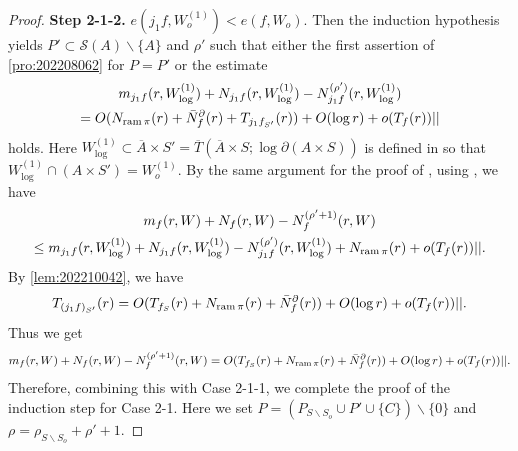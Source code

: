 \documentclass[11pt,english]{smfart}
\theoremstyle{plain}
\theoremstyle{definition}
\theoremstyle{remark}
\numberwithin{equation}{section}
\theoremstyle{plain}
\newcommand{\pN}[1]{\bar{N}_{#1}^{\partial}}
\newcommand{\ram}{{\rm ram}\,}
\begin{document}
\begin{proof}
		\textbf{Step 2-1-2.} $e(j_1f,W_o^{(1)})<e(f,W_o)$.
		Then the induction hypothesis yields $P'\subset \mathcal{S}(A)\backslash\{A\}$ and $\rho'$ such that either the first assertion of  \cref{pro:202208062} for $P=P'$ or the estimate
		\begin{multline*}
			m_{j_1f}(r,W_{\log}^{(1)})+N_{j_1f}(r,W_{\log}^{(1)})-N^{(\rho')}_{j_1f}(r,W_{\log}^{(1)})
			\\
			=O(N_{\ram\pi}(r)+\pN{f}(r)
			+T_{j_1f_{S'}}(r))+O(\log r)+o(T_f(r))||
		\end{multline*}
		holds.
		Here $W_{\log}^{(1)}\subset \overline{A}\times S'=\overline{T}(\overline{A}\times S;\log \partial (A\times S))$ is defined in \cite[Section 5]{Yam04} so that $W_{\log}^{(1)}\cap (A\times S')=W_o^{(1)}$.
		By the same argument for the proof of \cite[Lemma 5]{Yam15}, using \cite[Thm 5.1.7]{Yam04}, we have
		\begin{multline}\label{eqn:20250904}
			m_f(r,W)+N_f(r,W)-N^{(\rho'+1)}_f(r,W)
			\\
			\leq m_{j_1f}(r,W_{\log}^{(1)})+N_{j_1f}(r,W_{\log}^{(1)})-N^{(\rho')}_{j_1f}(r,W_{\log}^{(1)})+N_{\ram\pi}(r)+o(T_{f}(r))||.
		\end{multline}
		By \cref{lem:202210042}, we have 
		$$T_{(j_1f)_{S'}}(r)=O(T_{f_S}(r)+N_{\ram\pi}(r)+\pN{f}(r))+O(\log r)+o(T_f(r))||.$$
		Thus we get
		\begin{multline*}
			m_f(r,W)+N_f(r,W)-N^{(\rho'+1)}_f(r,W)=O(T_{f_S}(r)+N_{\ram\pi}(r)+\pN{f}(r))+O(\log r)+o(T_f(r))||. 	
		\end{multline*}		
		Therefore, combining this with Case 2-1-1, we complete the proof of the induction step for Case 2-1.
Here we set $P=(P_{S\backslash S_o}\cup P' \cup \{C\})\backslash \{0\}$ and $\rho=\rho_{S\backslash S_o}+\rho'+1$.
		
		
		
		
		

\end{proof}
\end{document}

